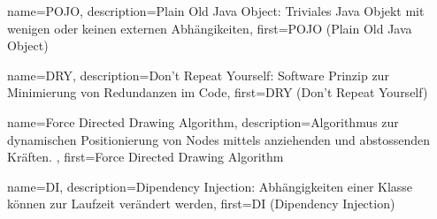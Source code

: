 {
	name={POJO},
	description={Plain Old Java Object: Triviales Java Objekt mit wenigen oder keinen externen Abhängikeiten},
	first={POJO (Plain Old Java Object)}
}

{
	name={DRY},
	description={Don't Repeat Yourself: Software Prinzip zur Minimierung von Redundanzen im Code},
	first={DRY (Don't Repeat Yourself)}
}

{
	name={Force Directed Drawing Algorithm},
	description={Algorithmus zur dynamischen Positionierung von Nodes mittels anziehenden und abstossenden Kräften. },
	first={Force Directed Drawing Algorithm}
}

{
	name={DI},
	description={Dipendency Injection: Abhängigkeiten einer Klasse können zur Laufzeit verändert werden},
	first={DI (Dipendency Injection)}
}




